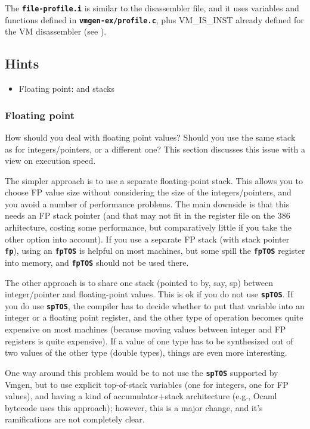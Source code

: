 \documentclass[10pt,english]{article}
\begin{document}
The \texttt{\textbf{file-profile.i}} is similar to the disassembler
file, and it uses variables and functions defined in \texttt{\textbf{vmgen-ex/profile.c}},
plus VM\_IS\_INST already defined for the VM disassembler (see ).


\subsection{Hints}
\begin{itemize}
\item Floating point: and stacks
\end{itemize}

\subsubsection{Floating point}

How should you deal with floating point values? Should you use the
same stack as for integers/pointers, or a different one? This section
discusses this issue with a view on execution speed.

The simpler approach is to use a separate floating-point stack. This
allows you to choose FP value size without considering the size of
the integers/pointers, and you avoid a number of performance problems.
The main downside is that this needs an FP stack pointer (and that
may not fit in the register file on the 386 arhitecture, costing some
performance, but comparatively little if you take the other option
into account). If you use a separate FP stack (with stack pointer
\texttt{\textbf{fp}}), using an \texttt{\textbf{fpTOS}} is helpful
on most machines, but some spill the \texttt{\textbf{fpTOS}} register
into memory, and \texttt{\textbf{fpTOS}} should not be used there.

The other approach is to share one stack (pointed to by, say, sp)
between integer/pointer and floating-point values. This is ok if you
do not use \texttt{\textbf{spTOS}}. If you do use \texttt{\textbf{spTOS}},
the compiler has to decide whether to put that variable into an integer
or a floating point register, and the other type of operation becomes
quite expensive on most machines (because moving values between integer
and FP registers is quite expensive). If a value of one type has to
be synthesized out of two values of the other type (double types),
things are even more interesting.

One way around this problem would be to not use the \texttt{\textbf{spTOS}}
supported by Vmgen, but to use explicit top-of-stack variables (one
for integers, one for FP values), and having a kind of accumulator+stack
architecture (e.g., Ocaml bytecode uses this approach); however, this
is a major change, and it's ramifications are not completely clear.
\end{document}
